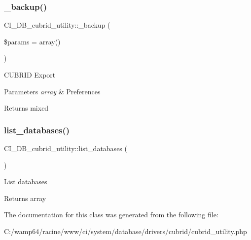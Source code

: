 \subsubsection{\texorpdfstring{\+\_\+backup()}{\_backup()}}
{\footnotesize\ttfamily C\+I\+\_\+\+D\+B\+\_\+cubrid\+\_\+utility\+::\+\_\+backup (\begin{DoxyParamCaption}\item[{}]{\$params = {\ttfamily array()} }\end{DoxyParamCaption})\hspace{0.3cm}{\ttfamily [protected]}}

C\+U\+B\+R\+ID Export


\begin{DoxyParams}{Parameters}
{\em array} & Preferences \\
\hline
\end{DoxyParams}
\begin{DoxyReturn}{Returns}
mixed 
\end{DoxyReturn}
\mbox{\label{class_c_i___d_b__cubrid__utility_a8a161268666efd6cd7a1147ca731ed36}} 
\subsubsection{\texorpdfstring{list\+\_\+databases()}{list\_databases()}}
{\footnotesize\ttfamily C\+I\+\_\+\+D\+B\+\_\+cubrid\+\_\+utility\+::list\+\_\+databases (\begin{DoxyParamCaption}{ }\end{DoxyParamCaption})}

List databases

\begin{DoxyReturn}{Returns}
array 
\end{DoxyReturn}


The documentation for this class was generated from the following file\+:\begin{DoxyCompactItemize}
\item 
C\+:/wamp64/racine/www/ci/system/database/drivers/cubrid/cubrid\+\_\+utility.\+php\end{DoxyCompactItemize}

